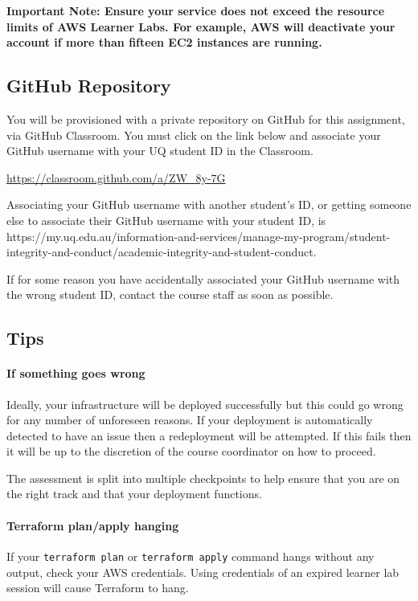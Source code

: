 \documentclass{csse4400}
\begin{document}
\textbf{Important Note: Ensure your service does not exceed the resource limits of AWS Learner Labs. For example, AWS will deactivate your account if more than fifteen EC2 instances are running.}

\subsection{GitHub Repository}\label{sec:github}
You will be provisioned with a private repository on GitHub for this assignment, via GitHub Classroom. You must click on the link below and associate your GitHub username with your UQ student ID in the Classroom.

\url{https://classroom.github.com/a/ZW_8y-7G}

\noindent
Associating your GitHub username with another student's ID, or getting someone else to associate their GitHub username with your student ID, is  {https://my.uq.edu.au/information-and-services/manage-my-program/student-integrity-and-conduct/academic-integrity-and-student-conduct}.

If for some reason you have accidentally associated your GitHub username with the wrong student ID, contact the course staff as soon as possible.

\subsection{Tips}

\paragraph{If something goes wrong}
Ideally, your infrastructure will be deployed successfully but this could go wrong for any number of unforeseen reasons. If your deployment is automatically detected to have an issue then a redeployment will be attempted. If this fails then it will be up to the discretion of the course coordinator on how to proceed.

The assessment is split into multiple checkpoints to help ensure that you are on the right track and that your deployment functions.

\paragraph{Terraform plan/apply hanging}
If your \texttt{terraform plan} or \texttt{terraform apply} command hangs without any output, check your AWS credentials. Using credentials of an expired learner lab session will cause Terraform to hang.
\end{document}
